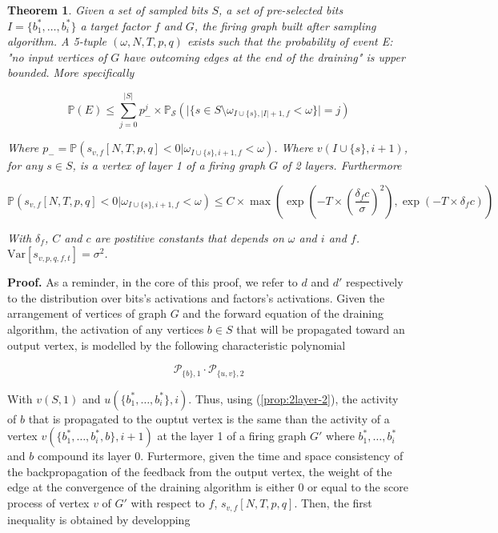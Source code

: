 \documentclass[a4paper, 11pt]{article}
\newtheorem{theorem}{Theorem}[section]
\newcommand{\Var}{\mathrm{Var}}
\begin{document}
\begin{theorem}
\label{th_stopping}
Given a set of sampled bits $S$, a set of pre-selected bits $I =\{b_{1}^{*}, \ldots, b_{i}^{*}\}$ a target factor $f$ and $G$, the firing graph built after sampling algorithm. A 5-tuple $(\omega, N, T, p, q)$ exists such that the probability of event E: "no input vertices of $G$ have outcoming edges at the end of the draining" is upper bounded. More specifically

\begin{equation*}
\mathbb{P} \left( E \right) \leq \sum_{j = 0}^{\vert S \vert} p_{-}^j \times \mathbb{P}_{\mathcal{S}} \left( \vert \lbrace s \in S \setminus \omega_{I \cup \{s\}, \vert I \vert + 1, f } < \omega \rbrace \vert = j \right) 
\end{equation*}

Where $p_{-} = \mathbb{P} \left( s_{v, f}[N, T, p,q] < 0 \vert \omega_{I \cup \{ s \}, i + 1, f} < \omega \right)$. Where $v(I \cup \{ s \}, i+1)$, for any $s \in S$, is a vertex of layer 1 of a firing graph $G$ of 2 layers. Furthermore

\begin{equation*}
\mathbb{P} \left( s_{v, f}[N, T, p, q]< 0 \vert \omega_{I \cup \{ s \}, i + 1, f} < \omega \right) \leq C \times \max \left( \exp\left(- T \times \left(\frac{\delta_{f} c}{\sigma}\right)^2 \right), \exp\left(- T \times \delta_{f}c \right) \right)
\end{equation*}

With $\delta_{f}$, $C$ and $c$ are postitive constants that depends on $\omega$ and $i$ and $f$. $\Var[s_{v, p, q, f, t}] = \sigma^2$. 

\end{theorem}

\textbf{Proof.} As a reminder, in the core of this proof, we refer to $d$ and $d'$ respectively to the distribution over bits's activations and factors's activations. Given the arrangement of vertices of graph $G$ and the forward equation of the draining algorithm, the activation of any vertices $b \in S$ that will be propagated toward an output vertex, is modelled by the following characteristic polynomial

\begin{equation*}
\mathcal{P}_{\{b\}, 1} \cdot \mathcal{P}_{\{u, v\}, 2}
\end{equation*}

With $v(S, 1)$ and $u(\{b_1^{*}, \ldots, b_i^{*}\}, i)$. Thus, using (\ref{prop:2layer-2}), the activity of $b$ that is propagated to the ouptut vertex is the same than the activity of a vertex $v(\{b_1^{*}, \ldots, b_i^{*}, b\}, i+1)$ at the layer 1 of a firing graph $G'$ where $b_1^{*}, \ldots, b_i^{*}$ and $b$ compound its layer 0. Furtermore, given the time and space consistency of the backpropagation of the feedback from the output vertex, the weight of the edge at the convergence of the draining algorithm is either $0$ or equal to the score process of vertex $v$ of $G'$ with respect to $f$, $s_{v, f}[N, T, p, q]$. Then, the first inequality is obtained by developping
\end{document}
